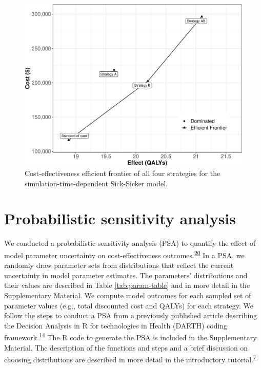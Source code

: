 \documentclass[
]{article}
\begin{document}
\begin{figure}[H]

{\centering \includegraphics{figs/Sick-Sicker-CEA-AgeDep-1} 

}

\caption{Cost-effectiveness efficient frontier of all four strategies for the simulation-time-dependent Sick-Sicker model.}\label{fig:Sick-Sicker-CEA-AgeDep}
\end{figure}

\hypertarget{probabilistic-sensitivity-analysis}{%
\section{Probabilistic sensitivity analysis}\label{probabilistic-sensitivity-analysis}}

We conducted a probabilistic sensitivity analysis (PSA) to quantify the effect of model parameter uncertainty on cost-effectiveness outcomes.\textsuperscript{\protect\hyperlink{ref-Briggs2012}{20}} In a PSA, we randomly draw parameter sets from distributions that reflect the current uncertainty in model parameter estimates. The parameters' distributions and their values are described in Table \ref{tab:param-table} and in more detail in the Supplementary Material. We compute model outcomes for each sampled set of parameter values (e.g., total discounted cost and QALYs) for each strategy. We follow the steps to conduct a PSA from a previously published article describing the Decision Analysis in R for technologies in Health (DARTH) coding framework.\textsuperscript{\protect\hyperlink{ref-Alarid-Escudero2019e}{14}} The R code to generate the PSA is included in the Supplementary Material. The description of the functions and steps and a brief discussion on choosing distributions are described in more detail in the introductory tutorial.\textsuperscript{\protect\hyperlink{ref-Alarid-Escudero2022b}{7}}
\end{document}
